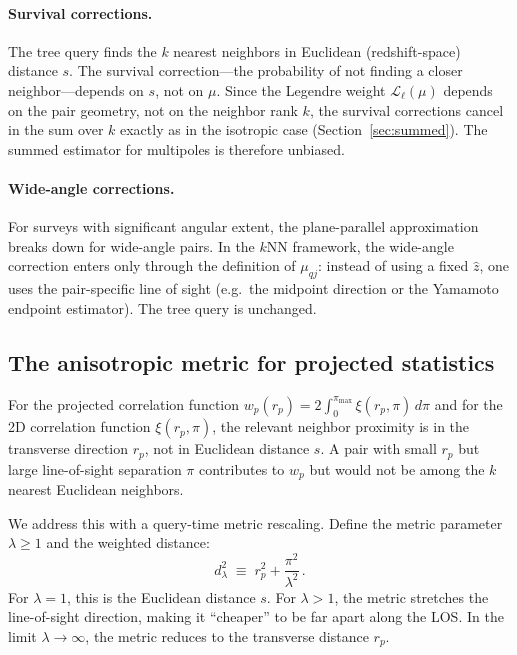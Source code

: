 \paragraph{Survival corrections.}  The tree query finds the $k$ nearest neighbors in Euclidean (redshift-space) distance $s$.  The survival correction---the probability of not finding a closer neighbor---depends on $s$, not on $\mu$.  Since the Legendre weight $\mathcal{L}_\ell(\mu)$ depends on the pair geometry, not on the neighbor rank $k$, the survival corrections cancel in the sum over $k$ exactly as in the isotropic case (Section~\ref{sec:summed}).  The summed estimator for multipoles is therefore unbiased.

\paragraph{Wide-angle corrections.}  For surveys with significant angular extent, the plane-parallel approximation breaks down for wide-angle pairs.  In the $k$NN framework, the wide-angle correction enters only through the definition of $\mu_{qj}$: instead of using a fixed $\hat{z}$, one uses the pair-specific line of sight (e.g.\ the midpoint direction or the Yamamoto endpoint estimator).  The tree query is unchanged.

\subsection{The anisotropic metric for projected statistics}
\label{sec:aniso_metric}

For the projected correlation function $w_p(r_p) = 2\int_0^{\pi_{\max}} \xi(r_p, \pi)\,d\pi$ and for the 2D correlation function $\xi(r_p, \pi)$, the relevant neighbor proximity is in the transverse direction $r_p$, not in Euclidean distance $s$.  A pair with small $r_p$ but large line-of-sight separation $\pi$ contributes to $w_p$ but would not be among the $k$ nearest Euclidean neighbors.

We address this with a query-time metric rescaling.  Define the metric parameter $\lambda \geq 1$ and the weighted distance:
\begin{equation}
  d_\lambda^2 \;\equiv\; r_p^2 + \frac{\pi^2}{\lambda^2}\,.
  \label{eq:d_lambda}
\end{equation}
For $\lambda = 1$, this is the Euclidean distance $s$.  For $\lambda > 1$, the metric stretches the line-of-sight direction, making it ``cheaper'' to be far apart along the LOS.  In the limit $\lambda \to \infty$, the metric reduces to the transverse distance $r_p$.

